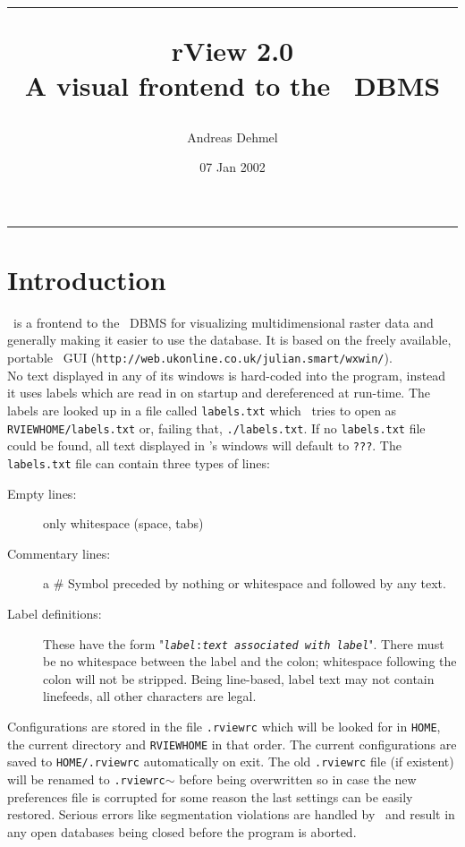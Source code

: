 \documentclass[11pt]{article}
\title{\hrule \vspace{10mm} \Huge rView 2.0\\A visual frontend to the \rman\ DBMS}
\author{Andreas Dehmel}
\date{07 Jan 2002}
\begin{document}
\maketitle

\vspace{10mm}
\hrule

\thispagestyle{empty}


\tableofcontents

\newpage

\section{Introduction}

\rview\ is a frontend to the \rman\ DBMS for visualizing multidimensional raster
data and generally making it easier to use the database. It is based on the
freely available, portable \wxwin\ GUI
(\texttt{http://web.ukonline.co.uk/julian.smart/wxwin/}).\\
No text displayed in any of its windows is hard-coded into the program, instead
it uses labels which are read in on startup and dereferenced at run-time. The
labels are looked up in a file called \texttt{labels.txt} which \rview\ tries to open as
\texttt{\dollar RVIEWHOME/labels.txt} or, failing that, \texttt{./labels.txt}. If
no \texttt{labels.txt} file could be found, all text displayed in \rview's windows
will default to \texttt{???}. The \texttt{labels.txt} file can contain three types of
lines:

\begin{description}
\item[Empty lines:] only whitespace (space, tabs)
\item[Commentary lines:] a \# Symbol preceded by nothing or whitespace and followed
by any text.
\item[Label definitions:] These have the form "\texttt{\textsl{label}:\textsl{text associated
with label}}". There must be no whitespace between the label and the colon; whitespace
following the colon will not be stripped. Being line-based, label text may not contain
linefeeds, all other characters are legal.
\end{description}

Configurations are stored in the file \texttt{.rviewrc} which will be looked for in
\texttt{\dollar HOME}, the current directory and \texttt{\dollar RVIEWHOME} in that order.
The current configurations are saved to \texttt{\dollar HOME/.rviewrc} automatically on
exit. The old \texttt{.rviewrc} file (if existent) will be renamed to \texttt{.rviewrc$\sim$}
before being overwritten so in case the new preferences file is corrupted for some
reason the last settings can be easily restored. Serious errors like segmentation violations
are handled by \rview\ and result in any open databases being closed before the program
is aborted.
\end{document}
